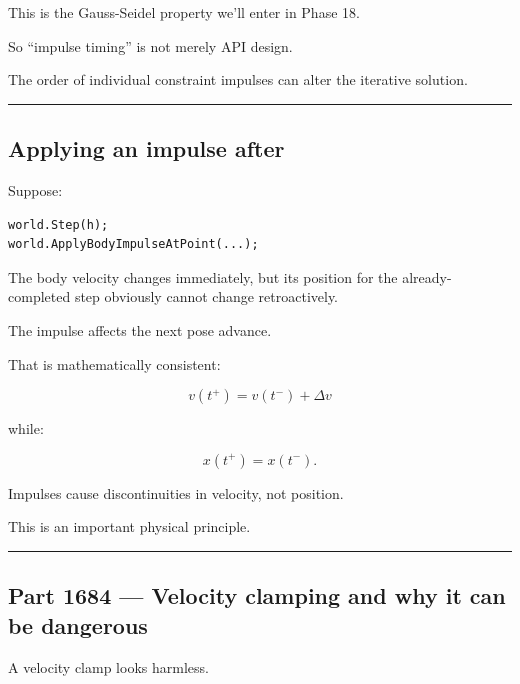 This is the Gauss-Seidel property we'll enter in Phase 18.

So ``impulse timing'' is not merely API design.

The order of individual constraint impulses can alter the iterative solution.

\begin{center}\rule{0.5\linewidth}{0.5pt}\end{center}

\subsection{\texorpdfstring{Applying an impulse after }{Applying an impulse after }}\label{06-engine-ii-ch038-applying-an-impulse-after-step}

\hypertarget{06-engine-ii-ch038-applying-an-impulse-after-step}{}

Suppose:

\begin{verbatim}
world.Step(h);
world.ApplyBodyImpulseAtPoint(...);
\end{verbatim}

The body velocity changes immediately, but its position for the already-completed step obviously cannot change retroactively.

The impulse affects the next pose advance.

That is mathematically consistent:

\[
v(t^+)=v(t^-)+\Delta v
\]

while:

\[
x(t^+)=x(t^-).
\]

Impulses cause discontinuities in velocity, not position.

This is an important physical principle.

\begin{center}\rule{0.5\linewidth}{0.5pt}\end{center}

\subsection{Part 1684 --- Velocity clamping and why it can be dangerous}\label{06-engine-ii-ch038-part-1684-velocity-clamping-and-why-it-can-be-dangerous}

\hypertarget{06-engine-ii-ch038-part-1684-velocity-clamping-and-why-it-can-be-dangerous}{}

A velocity clamp looks harmless.

